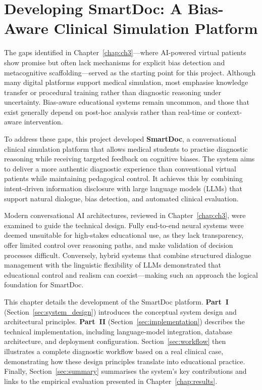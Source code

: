 \chapter{Developing SmartDoc: A Bias-Aware Clinical Simulation Platform}
\label{chap:ch4}

The gaps identified in Chapter~\ref{chap:ch3}—where AI-powered virtual patients show promise
but often lack mechanisms for explicit bias detection and metacognitive scaffolding—served
as the starting point for this project.
Although many digital platforms support medical simulation, most emphasise knowledge transfer
or procedural training rather than diagnostic reasoning under uncertainty.
Bias-aware educational systems remain uncommon, and those that exist generally depend on
post-hoc analysis rather than real-time or context-aware intervention.

To address these gaps, this project developed \textbf{SmartDoc}, a conversational clinical
simulation platform that allows medical students to practise diagnostic reasoning while
receiving targeted feedback on cognitive biases.
The system aims to deliver a more authentic diagnostic experience than conventional
virtual patients while maintaining pedagogical control.
It achieves this by combining intent-driven information disclosure with
large language models (LLMs) that support natural dialogue, bias detection, and
automated clinical evaluation.

Modern conversational AI architectures, reviewed in Chapter~\ref{chap:ch3},
were examined to guide the technical design.
Fully end-to-end neural systems were deemed unsuitable for high-stakes educational use,
as they lack transparency, offer limited control over reasoning paths,
and make validation of decision processes difficult.
Conversely, hybrid systems that combine structured dialogue management
with the linguistic flexibility of LLMs demonstrated that educational control
and realism can coexist—making such an approach the logical foundation
for SmartDoc.

This chapter details the development of the SmartDoc platform.
\textbf{Part~I} (Section~\ref{sec:system_design}) introduces the conceptual system design
and architectural principles.
\textbf{Part~II} (Section~\ref{sec:implementation}) describes the technical implementation,
including language-model integration, database architecture, and deployment configuration.
Section~\ref{sec:workflow} then illustrates a complete diagnostic workflow based on a
real clinical case, demonstrating how these design principles translate into educational
practice.
Finally, Section~\ref{sec:summary} summarises the system’s key contributions
and links to the empirical evaluation presented in Chapter~\ref{chap:results}.

